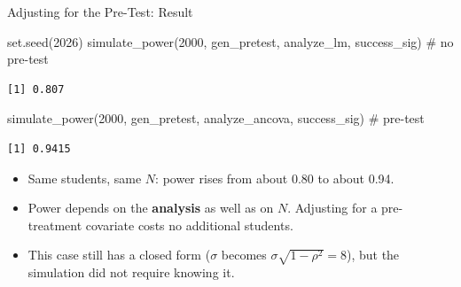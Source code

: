 \documentclass[
  ignorenonframetext,
  aspectratio=169,
]{beamer}
\newenvironment{Shaded}{\begin{snugshade}}{\end{snugshade}}
\newcommand{\CommentTok}[1]{\textcolor[rgb]{0.37,0.37,0.37}{#1}}
\newcommand{\DecValTok}[1]{\textcolor[rgb]{0.68,0.00,0.00}{#1}}
\newcommand{\FunctionTok}[1]{\textcolor[rgb]{0.28,0.35,0.67}{#1}}
\newcommand{\NormalTok}[1]{\textcolor[rgb]{0.00,0.23,0.31}{#1}}
\providecommand{\tightlist}{%
  \setlength{\itemsep}{0pt}\setlength{\parskip}{0pt}}
\begin{document}
\begin{frame}[fragile]{Adjusting for the Pre-Test: Result}
\label{adjusting-for-the-pre-test-result}
\begin{Shaded}
\begin{Highlighting}[]
\FunctionTok{set.seed}\NormalTok{(}\DecValTok{2026}\NormalTok{)}
\FunctionTok{simulate\_power}\NormalTok{(}\DecValTok{2000}\NormalTok{, gen\_pretest, analyze\_lm, success\_sig)     }\CommentTok{\# no pre{-}test}
\end{Highlighting}
\end{Shaded}

\begin{verbatim}
[1] 0.807
\end{verbatim}

\begin{Shaded}
\begin{Highlighting}[]
\FunctionTok{simulate\_power}\NormalTok{(}\DecValTok{2000}\NormalTok{, gen\_pretest, analyze\_ancova, success\_sig) }\CommentTok{\# pre{-}test}
\end{Highlighting}
\end{Shaded}

\begin{verbatim}
[1] 0.9415
\end{verbatim}

\vspace{0.4em}

\small

\begin{itemize}
\tightlist
\item
  Same students, same \(N\): power rises from about 0.80 to about 0.94.
\item
  Power depends on the \textbf{analysis} as well as on \(N\). Adjusting
  for a pre-treatment covariate costs no additional students.
\item
  This case still has a closed form (\(\sigma\) becomes
  \(\sigma\sqrt{1-\rho^2} = 8\)), but the simulation did not require
  knowing it.
\end{itemize}
\end{frame}
\end{document}

